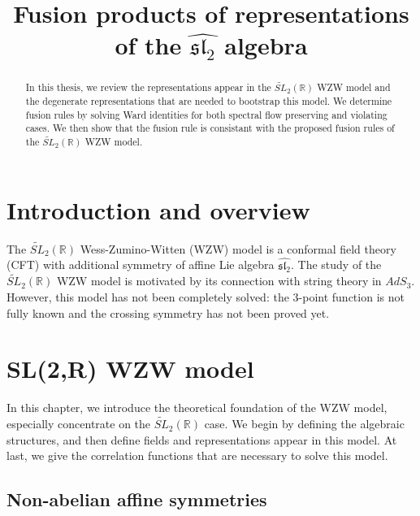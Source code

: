 \documentclass[10pt,a4paper]{article}
\numberwithin{equation}{section}
\begin{document}
\title{Fusion products of representations of the $\widehat{\mathfrak{sl}_{2}}$ algebra}
\maketitle


\begin{abstract}
    In this thesis, we review the representations appear in the $\widetilde{SL}_{2}(\mathbb{R})$ WZW model and the degenerate representations that are needed 
    to bootstrap this model. We determine fusion rules by solving Ward identities for both spectral flow preserving and violating cases. 
    We then show that the fusion rule is consistant with the proposed fusion rules of the $\widetilde{SL}_{2}(\mathbb{R})$ WZW model.
\end{abstract}

\tableofcontents

\section{Introduction and overview}
The $\widetilde{SL}_{2}(\mathbb{R})$ Wess-Zumino-Witten (WZW) model is a conformal field theory (CFT) with additional 
symmetry of affine Lie algebra $\widehat{\mathfrak{sl}_{2}}$. The study of the $\widetilde{SL}_{2}(\mathbb{R})$ WZW model is motivated by 
its connection with string theory in $AdS_{3}$. However, this model has not been completely solved: the 3-point function is not 
fully known and the crossing symmetry has not been proved yet. \\

















\section{SL(2,R) WZW model}
In this chapter, we introduce the theoretical foundation of the WZW model, especially concentrate on the 
$\widetilde{SL}_{2}(\mathbb{R})$ case. We begin by defining the algebraic structures, and then define fields and representations 
appear in this model. At last, we give the correlation functions that are necessary to solve this model. 

\subsection{Non-abelian affine symmetries}
\end{document}
